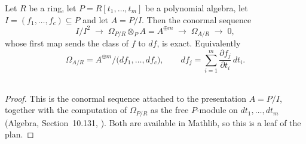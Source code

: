 \begin{lemma}
\label{lem:pc-omega-presentation}
Let $R$ be a ring, let $P=R[t_1,\dots,t_m]$ be a polynomial algebra, let
$I=(f_1,\dots,f_c)\subseteq P$ and let $A=P/I$.  Then the conormal sequence
\[
I/I^2\;\longrightarrow\;\Omega_{P/R}\otimes_PA=A^{\oplus m}\;\longrightarrow\;\Omega_{A/R}
\;\longrightarrow\;0,
\]
whose first map sends the class of $f$ to $df$, is exact.  Equivalently
\[
\Omega_{A/R}=A^{\oplus m}\big/\bigl(df_1,\dots,df_c\bigr),\qquad
df_j=\sum_{i=1}^m\frac{\partial f_j}{\partial t_i}\,dt_i .
\]
\mathlibok\ 
\end{lemma}
\begin{proof}
This is the conormal sequence attached to the presentation $A=P/I$, together with the
computation of $\Omega_{P/R}$ as the free $P$-module on $dt_1,\dots,dt_m$ (Algebra,
Section~10.131, ).  Both are available in Mathlib, so this is a leaf of
the plan.
\end{proof}

